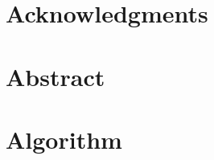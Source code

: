 \documentclass[a4paper,11pt,twoside,openright]{WCarticle}
\begin{document}

\tpage
\pagestyle{plain}

\chapter*{Acknowledgments}


\chapter*{Abstract} 

\tableofcontents
\listoffigures
\listoftables
\cleardoublepage
\pagestyle{fancy}

\iffalse
\chapter{Introduction} \label{chap:intro}\pagenumbering{arabic}



\chapter{Related Work} \label{chap:backgrd}




\chapter{Preliminaries} \label{chap:prelim}%


\fi
\chapter{Algorithm} \label{chap:alg}


\iffalse
\chapter{Implementation} \label{chap:impl}

\chapter{Evaluation} \label{chap:eval}


\chapter{Conclusion} \label{chap:conclusion}

\fi

\end{document}
